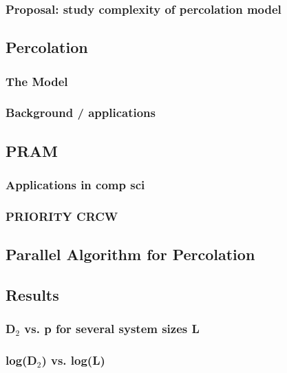 \documentclass[11pt]{article}
\begin{document}
\subsubsection{Proposal: study complexity of percolation model}
\label{sec-5.1.2}

\subsection{Percolation}
\label{sec-5.2}

\subsubsection{The Model}
\label{sec-5.2.1}

\subsubsection{Background / applications}
\label{sec-5.2.2}

\subsection{PRAM}
\label{sec-5.3}

\subsubsection{Applications in comp sci}
\label{sec-5.3.1}

\subsubsection{PRIORITY CRCW}
\label{sec-5.3.2}

\subsection{Parallel Algorithm for Percolation}
\label{sec-5.4}

\subsection{Results}
\label{sec-5.5}

\subsubsection{D$_2$ vs. p for several system sizes L}
\label{sec-5.5.1}

\subsubsection{log(D$_2$) vs. log(L)}
\label{sec-5.5.2}
\end{document}
